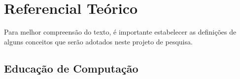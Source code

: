 \documentclass[
	12pt,				%
	openright,			%
	oneside,
	a4paper,			%
	english,			%
	french,				%
	spanish,			%
	brazil,				%
	]{abntex2}
\begin{document}
\chapter{Referencial Teórico}
Para melhor compreensão do texto, é importante estabelecer as definições de alguns conceitos que serão adotados neste projeto de pesquisa. 

\section{Educação de Computação}
\label{sec:EC}
\end{document}
